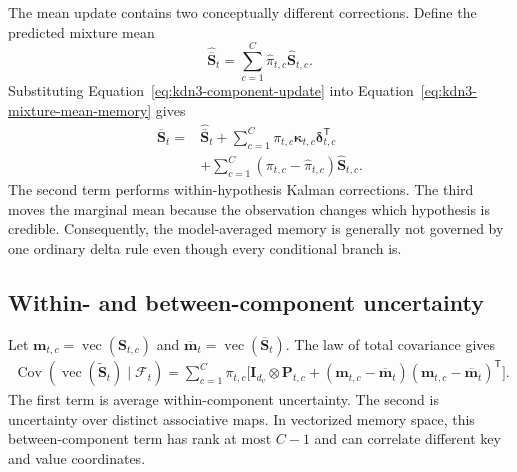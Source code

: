 \documentclass[11pt]{article}
\newcommand{\ve}[1]{\boldsymbol{#1}}
\newcommand{\tr}{\mathsf{T}}
\newcommand{\Cov}{\operatorname{Cov}}
\begin{document}
The mean update contains two conceptually different corrections.  Define the predicted mixture
mean
\begin{equation}
  \widehat{\overline{\ve{S}}}_t
  =\sum_{c=1}^{C}\widehat\pi_{t,c}\widehat{\ve{S}}_{t,c}.
  \label{eq:kdn3-predicted-mixture-mean}
\end{equation}
Substituting Equation~\eqref{eq:kdn3-component-update} into
Equation~\eqref{eq:kdn3-mixture-mean-memory} gives
\begin{equation}
\begin{aligned}
  \overline{\ve{S}}_t
  ={}&\widehat{\overline{\ve{S}}}_t
  +\sum_{c=1}^{C}
    \pi_{t,c}\ve{\kappa}_{t,c}\ve{\delta}_{t,c}^{\tr}
  \\
  &+\sum_{c=1}^{C}
    (\pi_{t,c}-\widehat\pi_{t,c})\widehat{\ve{S}}_{t,c}.
\end{aligned}
  \label{eq:kdn3-mixture-mean-decomposition}
\end{equation}
The second term performs within-hypothesis Kalman corrections.  The third moves the marginal mean
because the observation changes which hypothesis is credible.  Consequently, the model-averaged
memory is generally not governed by one ordinary delta rule even though every conditional branch
is.

\subsection{Within- and between-component uncertainty}

Let
$\ve{m}_{t,c}=\operatorname{vec}(\ve{S}_{t,c})$ and
$\overline{\ve{m}}_t=\operatorname{vec}(\overline{\ve{S}}_t)$.
The law of total covariance gives
\begin{equation}
\begin{aligned}
  \Cov(\operatorname{vec}(\widetilde{\ve{S}}_t)\mid\mathcal{F}_t)
  =\sum_{c=1}^{C}\pi_{t,c}\Big[
     \ve{I}_{d_v}\otimes\ve{P}_{t,c}
     +(\ve{m}_{t,c}-\overline{\ve{m}}_t)
      (\ve{m}_{t,c}-\overline{\ve{m}}_t)^{\tr}
   \Big].
  \label{eq:kdn3-total-covariance}
\end{aligned}
\end{equation}
The first term is average within-component uncertainty.  The second is uncertainty over distinct
associative maps.  In vectorized memory space, this between-component term has rank at most
$C-1$ and can correlate different key and value coordinates.
\end{document}
